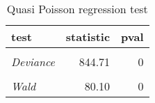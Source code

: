 \begin{table}[ht]

\caption{\label{tab:quasipoisson_reg_tests}Quasi Poisson regression test}
\centering
\begin{tabular}[t]{>{}lrr}
\toprule
test & statistic & pval\\
\midrule
\em{\cellcolor{gray!6}{Pearson}} & \cellcolor{gray!6}{2279.87} & \cellcolor{gray!6}{0}\\
\em{Deviance} & 844.71 & 0\\
\em{\cellcolor{gray!6}{LR}} & \cellcolor{gray!6}{67.65} & \cellcolor{gray!6}{0}\\
\em{Wald} & 80.10 & 0\\
\bottomrule
\end{tabular}
\end{table}
